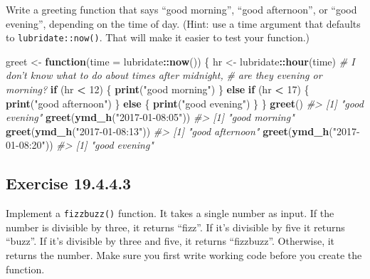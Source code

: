 \documentclass[]{book}
\newenvironment{Shaded}{\begin{snugshade}}{\end{snugshade}}
\newcommand{\CommentTok}[1]{\textcolor[rgb]{0.56,0.35,0.01}{\textit{#1}}}
\newcommand{\ControlFlowTok}[1]{\textcolor[rgb]{0.13,0.29,0.53}{\textbf{#1}}}
\newcommand{\DataTypeTok}[1]{\textcolor[rgb]{0.13,0.29,0.53}{#1}}
\newcommand{\DecValTok}[1]{\textcolor[rgb]{0.00,0.00,0.81}{#1}}
\newcommand{\KeywordTok}[1]{\textcolor[rgb]{0.13,0.29,0.53}{\textbf{#1}}}
\newcommand{\NormalTok}[1]{#1}
\newcommand{\OperatorTok}[1]{\textcolor[rgb]{0.81,0.36,0.00}{\textbf{#1}}}
\newcommand{\StringTok}[1]{\textcolor[rgb]{0.31,0.60,0.02}{#1}}
\theoremstyle{plain}
\theoremstyle{remark}
\begin{document}
Write a greeting function that says ``good morning'', ``good
afternoon'', or ``good evening'', depending on the time of day. (Hint:
use a time argument that defaults to \texttt{lubridate::now()}. That
will make it easier to test your function.)

\begin{Shaded}
\begin{Highlighting}[]
\NormalTok{greet <-}\StringTok{ }\ControlFlowTok{function}\NormalTok{(}\DataTypeTok{time =}\NormalTok{ lubridate}\OperatorTok{::}\KeywordTok{now}\NormalTok{()) \{}
\NormalTok{  hr <-}\StringTok{ }\NormalTok{lubridate}\OperatorTok{::}\KeywordTok{hour}\NormalTok{(time)}
  \CommentTok{# I don't know what to do about times after midnight,}
  \CommentTok{# are they evening or morning?}
  \ControlFlowTok{if}\NormalTok{ (hr }\OperatorTok{<}\StringTok{ }\DecValTok{12}\NormalTok{) \{}
    \KeywordTok{print}\NormalTok{(}\StringTok{"good morning"}\NormalTok{)}
\NormalTok{  \} }\ControlFlowTok{else} \ControlFlowTok{if}\NormalTok{ (hr }\OperatorTok{<}\StringTok{ }\DecValTok{17}\NormalTok{) \{}
    \KeywordTok{print}\NormalTok{(}\StringTok{"good afternoon"}\NormalTok{)}
\NormalTok{  \} }\ControlFlowTok{else}\NormalTok{ \{}
    \KeywordTok{print}\NormalTok{(}\StringTok{"good evening"}\NormalTok{)}
\NormalTok{  \}}
\NormalTok{\}}
\KeywordTok{greet}\NormalTok{()}
\CommentTok{#> [1] "good evening"}
\KeywordTok{greet}\NormalTok{(}\KeywordTok{ymd_h}\NormalTok{(}\StringTok{"2017-01-08:05"}\NormalTok{))}
\CommentTok{#> [1] "good morning"}
\KeywordTok{greet}\NormalTok{(}\KeywordTok{ymd_h}\NormalTok{(}\StringTok{"2017-01-08:13"}\NormalTok{))}
\CommentTok{#> [1] "good afternoon"}
\KeywordTok{greet}\NormalTok{(}\KeywordTok{ymd_h}\NormalTok{(}\StringTok{"2017-01-08:20"}\NormalTok{))}
\CommentTok{#> [1] "good evening"}
\end{Highlighting}
\end{Shaded}

\hypertarget{exercise-19.4.4.3}{%
\subsection*{\texorpdfstring{Exercise
{19.4.4.3}}{Exercise 19.4.4.3}}\label{exercise-19.4.4.3}}

Implement a \texttt{fizzbuzz()} function. It takes a single number as
input. If the number is divisible by three, it returns ``fizz''. If it's
divisible by five it returns ``buzz''. If it's divisible by three and
five, it returns ``fizzbuzz''. Otherwise, it returns the number. Make
sure you first write working code before you create the function.
\end{document}
